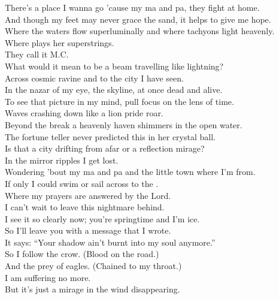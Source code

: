 \label{album:flight-b741}



There's a place I wanna go 'cause my ma and pa, they fight at home. \\
And though my feet may never grace the sand, it helps to give me hope. \\
Where the waters flow superluminally and where tachyons light heavenly. \\
Where  plays her superstrings. \\
They call it M.C. \\

What would it mean to be a beam travelling like lightning? \\
Across cosmic ravine and to the city I have seen. \\
In the nazar of my eye, the skyline, at once dead and alive. \\
To see that picture in my mind, pull focus on the lens of time. \\

Waves crashing down like a lion pride roar. \\
Beyond the break a heavenly haven shimmers in the open water. \\
The fortune teller never predicted this in her crystal ball. \\
Is that a city drifting from afar or a reflection mirage? \\

In the mirror ripples I get lost. \\
Wondering 'bout my ma and pa and the little town where I'm from. \\
If only I could swim or sail across to the . \\
Where my prayers are answered by the Lord. \\

I can't wait to leave this nightmare behind. \\
I see it so clearly now; you're springtime and I'm ice. \\
So I'll leave you with a message that I wrote. \\
It says: ``Your shadow ain't burnt into my soul anymore.'' \\

So I follow the crow. (Blood on the road.) \\
And the prey of eagles. (Chained to my throat.) \\
I am suffering no more. \\
But it's just a mirage in the wind disappearing. \\

